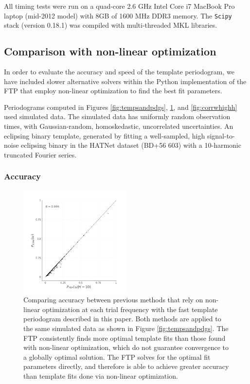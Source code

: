 \documentclass[apj]{emulateapj}
\begin{document}
All timing tests were run on a quad-core 2.6 GHz Intel Core i7 MacBook
Pro laptop (mid-2012 model) with 8GB of 1600 MHz DDR3 memory. The \texttt{Scipy} stack
(version 0.18.1) was compiled with multi-threaded MKL libraries.

\subsection{Comparison with non-linear optimization}

In order to evaluate the accuracy and speed of the template periodogram,
we have included slower alternative solvers within the Python implementation
of the FTP that employ non-linear optimization to find the best fit parameters.

Periodograms computed in Figures \ref{fig:tempsandpdgs}, \ref{fig:corrwgats},
and \ref{fig:corrwhighh} used simulated data. The simulated data has uniformly
random observation times, with Gaussian-random, homoskedastic, uncorrelated
uncertainties. An eclipsing binary template, generated by fitting a well-sampled,
high signal-to-noise eclipsing binary in the HATNet dataset (BD+56 603)
with a 10-harmonic truncated Fourier series.

\subsubsection{Accuracy}

\begin{figure}
    \centering
    \includegraphics[width=0.5\textwidth]{correlation_with_nonlinopt.pdf}
    \caption{\label{fig:corrwgats} Comparing accuracy between previous methods that rely
            on non-linear optimization at each trial frequency with the fast template periodogram
            described in this paper. Both methods are applied to the same simulated data as shown
            in Figure \ref{fig:tempsandpdgs}.
            The FTP consistently finds more optimal template fits than
            those found with non-linear optimization, which do not guarantee convergence to
            a globally optimal solution. The FTP solves for the optimal
            fit parameters directly, and therefore is able to achieve greater accuracy than template
            fits done via non-linear optimization.}
\end{figure}
\end{document}
